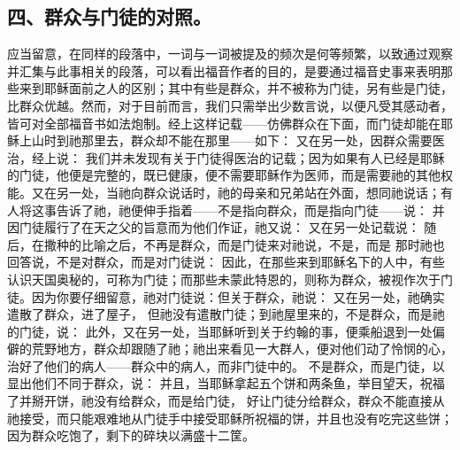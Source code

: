 
\subsection{四、群众与门徒的对照。}

 应当留意，在同样的段落中，一词与一词被提及的频次是何等频繁，以致通过观察并汇集与此事相关的段落，可以看出福音作者的目的，是要通过福音史事来表明那些来到耶稣面前之人的区别；其中有些是群众，并不被称为门徒，另有些是门徒，比群众优越。然而，对于目前而言，我们只需举出少数言说，以便凡受其感动者，皆可对全部福音书如法炮制。经上这样记载——仿佛群众在下面，而门徒却能在耶稣上山时到祂那里去，群众却不能在那里——如下： 又在另一处，因群众需要医治，经上说： 我们并未发现有关于门徒得医治的记载；因为如果有人已经是耶稣的门徒，他便是完整的，既已健康，便不需要耶稣作为医师，而是需要祂的其他权能。又在另一处，当祂向群众说话时，祂的母亲和兄弟站在外面，想同祂说话；有人将这事告诉了祂，祂便伸手指着——不是指向群众，而是指向门徒——说： 并因门徒履行了在天之父的旨意而为他们作证，祂又说： 又在另一处记载说： 随后，在撒种的比喻之后，不再是群众，而是门徒来对祂说，不是，而是 那时祂也回答说，不是对群众，而是对门徒说： 因此，在那些来到耶稣名下的人中，有些认识天国奥秘的，可称为门徒；而那些未蒙此特恩的，则称为群众，被视作次于门徒。因为你要仔细留意，祂对门徒说：但关于群众，祂说： 又在另一处，祂确实遣散了群众，进了屋子， 但祂没有遣散门徒；到祂屋里来的，不是群众，而是祂的门徒，说： 此外，又在另一处，当耶稣听到关于约翰的事，便乘船退到一处偏僻的荒野地方，群众却跟随了祂；祂出来看见一大群人，便对他们动了怜悯的心，治好了他们的病人——群众中的病人，而非门徒中的。 不是群众，而是门徒，以显出他们不同于群众，说： 并且，当耶稣拿起五个饼和两条鱼，举目望天，祝福了并掰开饼，祂没有给群众，而是给门徒， 好让门徒分给群众，群众不能直接从祂接受，而只能艰难地从门徒手中接受耶稣所祝福的饼，并且也没有吃完这些饼；因为群众吃饱了，剩下的碎块以满盛十二筐。\par

